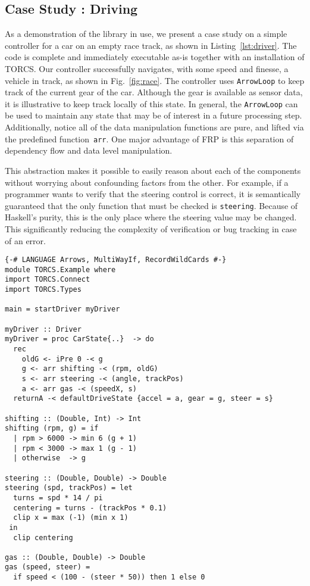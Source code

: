 \subsection{Case Study : Driving}

As a demonstration of the \ourLib library in use, we present a case study on a simple controller for a car on an empty race track, as shown in Listing~\ref{lst:driver}. 
The code is complete and immediately executable as-is together with an installation of TORCS.
Our controller successfully navigates, with some speed and finesse, a vehicle in track, as shown in Fig.~\ref{fig:race}.
The controller uses \texttt{ArrowLoop} to keep track of the current gear of the car.
Although the gear is available as sensor data, it is illustrative to keep track locally of this state.
In general, the \texttt{ArrowLoop} can be used to maintain any state that may be of interest in a future processing step.
Additionally, notice all of the data manipulation functions are pure, and lifted via the predefined function~\texttt{arr}.
One major advantage of FRP is this separation of dependency flow and data level manipulation. 

This abstraction makes it possible to easily reason about each of the components without worrying about confounding factors from the other.
For example, if a programmer wants to verify that the steering control is correct, it is semantically guaranteed that the only function that must be checked is \texttt{steering}.
Because of Haskell's purity, this is the only place where the steering value may be changed. This significantly reducing the complexity of verification or bug tracking in case of an error.

\begin{lstlisting}[float,floatplacement=TR,caption=A complete basic controller in Yampa, label=lst:driver]
{-# LANGUAGE Arrows, MultiWayIf, RecordWildCards #-}
module TORCS.Example where
import TORCS.Connect
import TORCS.Types

main = startDriver myDriver

myDriver :: Driver
myDriver = proc CarState{..}  -> do
  rec 
    oldG <- iPre 0 -< g
    g <- arr shifting -< (rpm, oldG)
    s <- arr steering -< (angle, trackPos)
    a <- arr gas -< (speedX, s)
  returnA -< defaultDriveState {accel = a, gear = g, steer = s}

shifting :: (Double, Int) -> Int
shifting (rpm, g) = if 
  | rpm > 6000 -> min 6 (g + 1)
  | rpm < 3000 -> max 1 (g - 1)
  | otherwise  -> g
 
steering :: (Double, Double) -> Double
steering (spd, trackPos) = let
  turns = spd * 14 / pi
  centering = turns - (trackPos * 0.1)
  clip x = max (-1) (min x 1)
 in
  clip centering

gas :: (Double, Double) -> Double
gas (speed, steer) = 
  if speed < (100 - (steer * 50)) then 1 else 0
\end{lstlisting}


